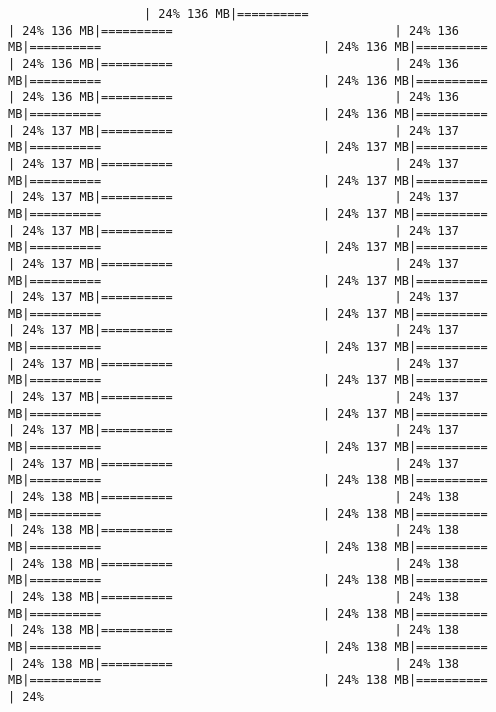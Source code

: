 \documentclass[
]{article}
\begin{document}
\begin{verbatim}
                   | 24% 136 MB|==========                               | 24% 136 MB|==========                               | 24% 136 MB|==========                               | 24% 136 MB|==========                               | 24% 136 MB|==========                               | 24% 136 MB|==========                               | 24% 136 MB|==========                               | 24% 136 MB|==========                               | 24% 136 MB|==========                               | 24% 136 MB|==========                               | 24% 137 MB|==========                               | 24% 137 MB|==========                               | 24% 137 MB|==========                               | 24% 137 MB|==========                               | 24% 137 MB|==========                               | 24% 137 MB|==========                               | 24% 137 MB|==========                               | 24% 137 MB|==========                               | 24% 137 MB|==========                               | 24% 137 MB|==========                               | 24% 137 MB|==========                               | 24% 137 MB|==========                               | 24% 137 MB|==========                               | 24% 137 MB|==========                               | 24% 137 MB|==========                               | 24% 137 MB|==========                               | 24% 137 MB|==========                               | 24% 137 MB|==========                               | 24% 137 MB|==========                               | 24% 137 MB|==========                               | 24% 137 MB|==========                               | 24% 137 MB|==========                               | 24% 137 MB|==========                               | 24% 137 MB|==========                               | 24% 137 MB|==========                               | 24% 137 MB|==========                               | 24% 137 MB|==========                               | 24% 137 MB|==========                               | 24% 137 MB|==========                               | 24% 137 MB|==========                               | 24% 137 MB|==========                               | 24% 137 MB|==========                               | 24% 138 MB|==========                               | 24% 138 MB|==========                               | 24% 138 MB|==========                               | 24% 138 MB|==========                               | 24% 138 MB|==========                               | 24% 138 MB|==========                               | 24% 138 MB|==========                               | 24% 138 MB|==========                               | 24% 138 MB|==========                               | 24% 138 MB|==========                               | 24% 138 MB|==========                               | 24% 138 MB|==========                               | 24% 138 MB|==========                               | 24% 138 MB|==========                               | 24% 138 MB|==========                               | 24% 138 MB|==========                               | 24% 138 MB|==========                               | 24% 138 MB|==========                               | 24% 138 MB|==========                               | 24% 
\end{verbatim}
\end{document}

